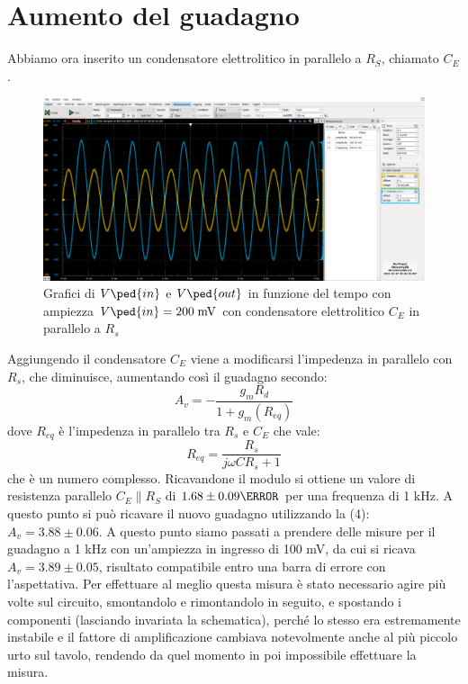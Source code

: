 \documentclass[10pt, a4paper, italian]{article}
\begin{document}
\section{Aumento del guadagno}
Abbiamo ora inserito un condensatore elettrolitico in parallelo a $R_S$, chiamato $C_E$.
\begin{figure}[htbp]
    \centering
	\includegraphics[scale=0.4]{amp.200.cap}
    \caption{Grafici di $V\ped{in}$ e $V\ped{out}$ in funzione del tempo con ampiezza $V\ped{in}=200 \; \si{m\V}$ con condensatore elettrolitico $C_E$ in parallelo a $R_s$}
\end{figure}
Aggiungendo il condensatore $C_E$ viene a modificarsi l'impedenza in parallelo con $R_s$, che diminuisce, aumentando così il guadagno secondo:
\begin{equation}
A_v = -\frac{g_m R_d}{1+g_m (R_{eq})}
\end{equation}
dove $R_{eq}$ è l'impedenza in parallelo tra $R_s$ e $C_E$ che vale:
\begin{equation}
R_{eq} = \frac{R_s}{j\omega C R_s +1}
\end{equation}
che è un numero complesso.
Ricavandone il modulo si ottiene un valore di resistenza parallelo $C_E \parallel R_S$ di $1.68 \pm 0.09 \ohm$ per una frequenza di 1 kHz.
A questo punto si può ricavare il nuovo guadagno utilizzando la (4):
$A_v =3.88 \pm 0.06$.
A questo punto siamo passati a prendere delle misure per il guadagno a 1 kHz con un'ampiezza in ingresso di 100 mV, da cui si ricava $A_v=3.89 \pm 0.05$, risultato compatibile entro una barra di errore con l'aspettativa. Per effettuare al meglio questa misura è stato necessario agire più volte sul circuito, smontandolo e rimontandolo in seguito, e spostando i componenti (lasciando invariata la schematica), perché lo stesso era estremamente instabile e il fattore di amplificazione cambiava notevolmente anche al più piccolo urto sul tavolo, rendendo da quel momento in poi impossibile effettuare la misura.
\end{document}
